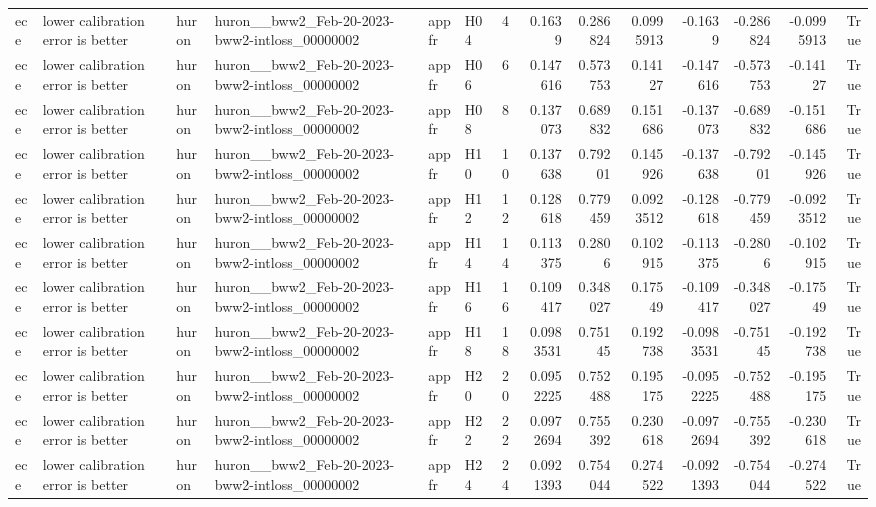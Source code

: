 \begin{longtable}{llllllrrrrrrrr}
ece & lower calibration error is better & huron & huron\_\_bww2\_Feb-20-2023-bww2-intloss\_00000002 & appfr & H04 & 4 & 0.1639 & 0.286824 & 0.0995913 & -0.1639 & -0.286824 & -0.0995913 & True \\
ece & lower calibration error is better & huron & huron\_\_bww2\_Feb-20-2023-bww2-intloss\_00000002 & appfr & H06 & 6 & 0.147616 & 0.573753 & 0.14127 & -0.147616 & -0.573753 & -0.14127 & True \\
ece & lower calibration error is better & huron & huron\_\_bww2\_Feb-20-2023-bww2-intloss\_00000002 & appfr & H08 & 8 & 0.137073 & 0.689832 & 0.151686 & -0.137073 & -0.689832 & -0.151686 & True \\
ece & lower calibration error is better & huron & huron\_\_bww2\_Feb-20-2023-bww2-intloss\_00000002 & appfr & H10 & 10 & 0.137638 & 0.79201 & 0.145926 & -0.137638 & -0.79201 & -0.145926 & True \\
ece & lower calibration error is better & huron & huron\_\_bww2\_Feb-20-2023-bww2-intloss\_00000002 & appfr & H12 & 12 & 0.128618 & 0.779459 & 0.0923512 & -0.128618 & -0.779459 & -0.0923512 & True \\
ece & lower calibration error is better & huron & huron\_\_bww2\_Feb-20-2023-bww2-intloss\_00000002 & appfr & H14 & 14 & 0.113375 & 0.2806 & 0.102915 & -0.113375 & -0.2806 & -0.102915 & True \\
ece & lower calibration error is better & huron & huron\_\_bww2\_Feb-20-2023-bww2-intloss\_00000002 & appfr & H16 & 16 & 0.109417 & 0.348027 & 0.17549 & -0.109417 & -0.348027 & -0.17549 & True \\
ece & lower calibration error is better & huron & huron\_\_bww2\_Feb-20-2023-bww2-intloss\_00000002 & appfr & H18 & 18 & 0.0983531 & 0.75145 & 0.192738 & -0.0983531 & -0.75145 & -0.192738 & True \\
ece & lower calibration error is better & huron & huron\_\_bww2\_Feb-20-2023-bww2-intloss\_00000002 & appfr & H20 & 20 & 0.0952225 & 0.752488 & 0.195175 & -0.0952225 & -0.752488 & -0.195175 & True \\
ece & lower calibration error is better & huron & huron\_\_bww2\_Feb-20-2023-bww2-intloss\_00000002 & appfr & H22 & 22 & 0.0972694 & 0.755392 & 0.230618 & -0.0972694 & -0.755392 & -0.230618 & True \\
ece & lower calibration error is better & huron & huron\_\_bww2\_Feb-20-2023-bww2-intloss\_00000002 & appfr & H24 & 24 & 0.0921393 & 0.754044 & 0.274522 & -0.0921393 & -0.754044 & -0.274522 & True \\

\end{longtable}
